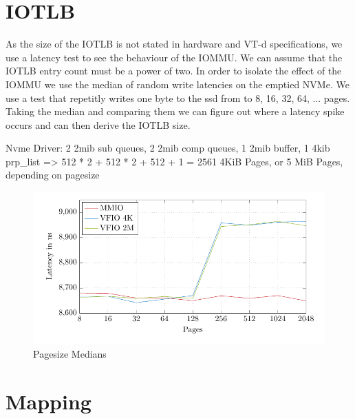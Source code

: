 \section{IOTLB}
As the size of the IOTLB is not stated in hardware and VT-d specifications, we use a latency test to see the behaviour of the IOMMU. We can assume that the IOTLB entry count must be a power of two. In order to isolate the effect of the IOMMU we use the median of random write latencies on the emptied NVMe. We use a test that repetitly writes one byte to the ssd from to 8, 16, 32, 64, ... pages. Taking the median and comparing them we can figure out where a latency spike occurs and can then derive the IOTLB size.

Nvme Driver: 2 2mib sub queues, 2 2mib comp queues, 1 2mib buffer, 1 4kib prp\_list => 512 * 2 + 512 * 2 + 512 + 1 = 2561 4KiB Pages, or 5 MiB Pages, depending on pagesize

\begin{figure}
    \centering
    \includegraphics[width=\textwidth]{figures/latency_ps_medians}
    \caption{Pagesize Medians}
    \label{fig:med-ps}
\end{figure}

\section{Mapping}